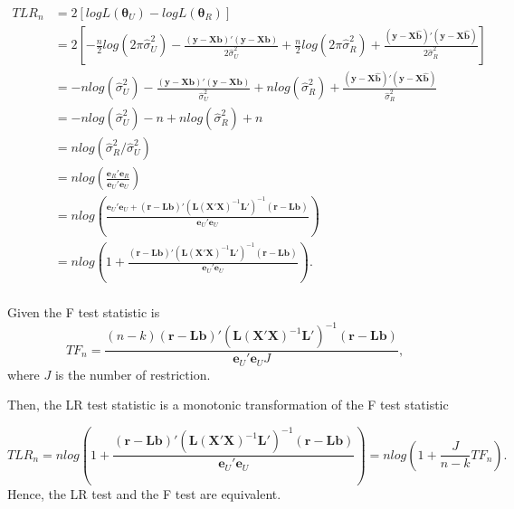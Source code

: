 \documentclass[
]{article}
\begin{document}
\begin{align*}
TLR_n &= 2[logL(\boldsymbol{\theta}_U) - logL(\boldsymbol{\theta}_R)] \\
&= 2[-\frac{n}{2}log(2\pi\hat{\sigma}^2_U)-\frac{(\boldsymbol{y}-\boldsymbol{X}\boldsymbol{b})'(\boldsymbol{y}-\boldsymbol{X}\boldsymbol{b})}{2\hat{\sigma}^2_U}+\frac{n}{2}log(2\pi\hat{\sigma}^2_R)+\frac{(\boldsymbol{y}-\boldsymbol{X}\hat{\boldsymbol{b}})'(\boldsymbol{y}-\boldsymbol{X}\hat{\boldsymbol{b}})}{2\hat{\sigma}^2_R}] \\
&= -nlog(\hat{\sigma}^2_U)-\frac{(\boldsymbol{y}-\boldsymbol{X}\boldsymbol{b})'(\boldsymbol{y}-\boldsymbol{X}\boldsymbol{b})}{\hat{\sigma}^2_U}+nlog(\hat{\sigma}^2_R)+\frac{(\boldsymbol{y}-\boldsymbol{X}\hat{\boldsymbol{b}})'(\boldsymbol{y}-\boldsymbol{X}\hat{\boldsymbol{b}})}{\hat{\sigma}^2_R} \\
&= -nlog(\hat{\sigma}^2_U)-n+nlog(\hat{\sigma}^2_R)+n \\
&= nlog(\hat{\sigma}^2_R/\hat{\sigma}^2_U) \\
&= nlog(\frac{\boldsymbol{e}_R'\boldsymbol{e}_R}{\boldsymbol{e}_U'\boldsymbol{e}_U})\\
&= nlog(\frac{\boldsymbol{e}_U'\boldsymbol{e}_U + (\boldsymbol{r}-\boldsymbol{L}\boldsymbol{b})'(\boldsymbol{L}(\boldsymbol{X}'\boldsymbol{X})^{-1}\boldsymbol{L}')^{-1}(\boldsymbol{r}-\boldsymbol{L}\boldsymbol{b})}{\boldsymbol{e}_U'\boldsymbol{e}_U})\\
&= nlog(1 +\frac{(\boldsymbol{r}-\boldsymbol{L}\boldsymbol{b})'(\boldsymbol{L}(\boldsymbol{X}'\boldsymbol{X})^{-1}\boldsymbol{L}')^{-1}(\boldsymbol{r}-\boldsymbol{L}\boldsymbol{b})}{\boldsymbol{e}_U'\boldsymbol{e}_U}).\\
\end{align*}

Given the F test statistic is
\[TF_n =  \frac{(n-k)(\boldsymbol{r}-\boldsymbol{L}\boldsymbol{b})'(\boldsymbol{L}(\boldsymbol{X}'\boldsymbol{X})^{-1}\boldsymbol{L}')^{-1}(\boldsymbol{r}-\boldsymbol{L}\boldsymbol{b})}{\boldsymbol{e}_U'\boldsymbol{e}_UJ},\]
where \(J\) is the number of restriction.

Then, the LR test statistic is a monotonic transformation of the F test
statistic

\[TLR_n = nlog(1 +\frac{(\boldsymbol{r}-\boldsymbol{L}\boldsymbol{b})'(\boldsymbol{L}(\boldsymbol{X}'\boldsymbol{X})^{-1}\boldsymbol{L}')^{-1}(\boldsymbol{r}-\boldsymbol{L}\boldsymbol{b})}{\boldsymbol{e}_U'\boldsymbol{e}_U}) = nlog(1+\frac{J}{n-k}TF_n).\]
Hence, the LR test and the F test are equivalent.
\end{document}
